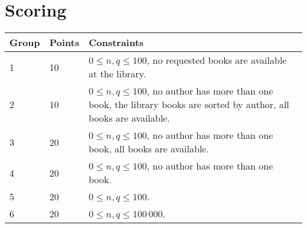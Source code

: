 \section*{Scoring}
\begin{tabular}{|l|l|l|}
\hline
Group & Points & Constraints \\ \hline
1     & 10   & $0 \leq n, q \leq 100$, no requested books are available at the library. \\ \hline
2     & 10   & $0 \leq n, q \leq 100$, no author has more than one book, the library books are sorted by author, all books are available. \\ \hline
3     & 20   & $0 \leq n, q \leq 100$, no author has more than one book, all books are available. \\ \hline
4     & 20   & $0 \leq n, q \leq 100$, no author has more than one book. \\ \hline
5     & 20   & $0 \leq n, q \leq 100$. \\ \hline
6     & 20   & $0 \leq n, q \leq 100\,000$. \\ \hline
\end{tabular}

